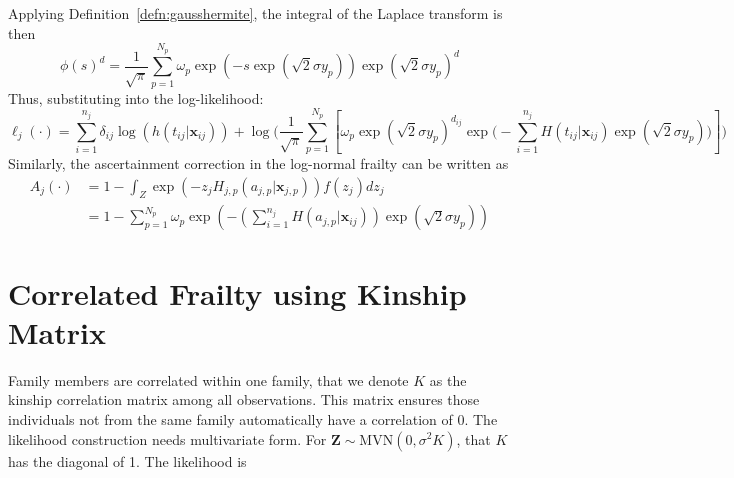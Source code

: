 \documentclass[preprint,12pt]{elsarticle}
\begin{document}
\noindent
Applying Definition~\ref{defn:gausshermite}, the integral of the Laplace transform is then
\begin{equation}
    \phi(s)^d=\frac{1}{\sqrt{\pi}}\sum_{p=1}^{N_p}\omega_p\exp(-s\exp(\sqrt{2}\sigma y_p))\exp(\sqrt{2}\sigma y_p)^d
\end{equation}
Thus, substituting into the log-likelihood:
\begin{equation}
    \ell_j(\cdot)=\sum_{i=1}^{n_j}\delta_{ij}\log(h(t_{ij}|\mathbf{x}_{ij}))+\log\Big (\frac{1}{\sqrt{\pi}}\sum_{p=1}^{N_p}\left [\omega_p\exp(\sqrt{2}\sigma y_p)^{d_{ij}}\exp\Big (-\sum_{i=1}^{n_j}H(t_{ij}|\mathbf{x}_{ij})\exp(\sqrt{2}\sigma y_p)\Big )\right ]\Big )
\end{equation}
Similarly, the ascertainment correction in the log-normal frailty can be written as 
\begin{align}
    A_j(\cdot)&=1-\int_Z \exp(-z_j H_{j,p}(a_{j,p}|\mathbf{x}_{j,p}))f(z_j)dz_j\\
    &=1-\sum_{p=1}^{N_p}\omega_p \exp\left (-(\sum_{i=1}^{n_j} H(a_{j,p}|\mathbf{x}_{ij}))\exp (\sqrt{2}\sigma y_{p})\right )
\end{align}

\section{Correlated Frailty using Kinship Matrix}
Family members are correlated within one family, that we denote $K$ as the kinship correlation matrix among all observations. This matrix ensures those individuals not from the same family automatically have a correlation of 0. The likelihood construction needs multivariate form. For $\mathbf{Z}\sim\text{MVN}(0,\sigma^2K)$, that $K$ has the diagonal of 1. The likelihood is 
\end{document}
